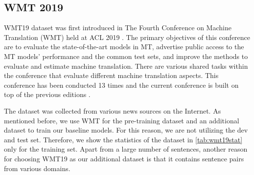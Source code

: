 \subsection{WMT 2019}
WMT19 dataset was first introduced in The Fourth Conference on Machine Translation (WMT) held at ACL 2019 . The primary objectives of this conference are to evaluate the state-of-the-art models in MT, advertise public access to the MT models' performance and the common test sets, and improve the methods to evaluate and estimate machine translation. There are various shared tasks within the conference that evaluate different machine translation aspects. This conference has been conducted 13 times and the current conference is built on top of the previous editions .

The dataset was collected from various news sources on the Internet. As mentioned before, we use WMT for the pre-training dataset and an additional dataset to train our baseline models. For this reason, we are not utilizing the dev and test set. Therefore, we show the statistics of the dataset in \cref{tab:wmt19stat} only for the training set. Apart from a large number of sentences, another reason for choosing WMT19 as our additional dataset is that it contains sentence pairs from various domains.

